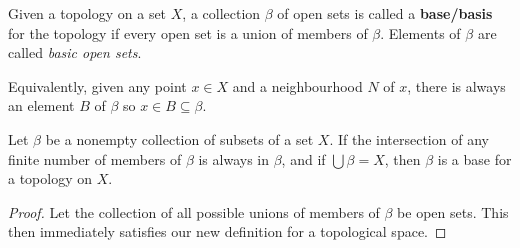 \begin{definition}
    Given a topology on a set $X$, a collection $\beta$ of open sets is called a \textbf{base/basis} for the topology if every open set is a union of members of $\beta$. Elements of $\beta$ are called \emph{basic open sets}.

    Equivalently, given any point $x \in X$ and a neighbourhood $N$ of $x$, there is always an element $B$ of $\beta$ so $x\in B\subseteq\beta$.
\end{definition}
\begin{theorem}
    Let $\beta$ be a nonempty collection of subsets of a set $X$. If the intersection of any finite number of members of $\beta$ is always in $\beta$, and if $\bigcup\beta=X$, then $\beta$ is a base for a topology on $X$.
\end{theorem}
\begin{proof}
    Let the collection of all possible unions of members of $\beta$ be open sets. This then immediately satisfies our new definition for a topological space.
\end{proof}
